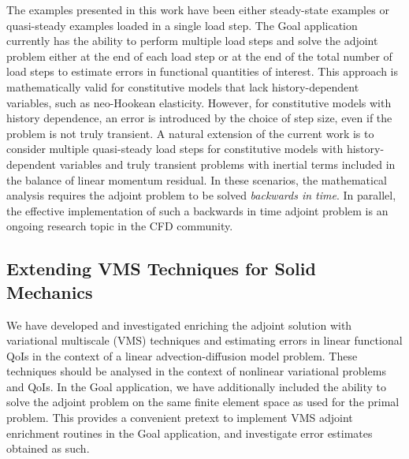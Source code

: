 The examples presented in this work have been either steady-state examples
or quasi-steady examples loaded in a single load step.
The Goal application currently has the ability to perform multiple load
steps and solve the adjoint problem either at the end of each load step
or at the end of the total number of load steps to estimate errors in functional
quantities of interest. This approach is mathematically valid for constitutive
models that lack history-dependent variables, such as neo-Hookean elasticity.
However, for constitutive models with history dependence, an error is
introduced by the choice of step size, even if the problem is not truly
transient. A natural extension of the current work is to consider multiple
quasi-steady load steps for constitutive models with history-dependent variables
and truly transient problems with inertial terms included in the balance
of linear momentum residual. In these scenarios, the mathematical analysis
requires the adjoint problem to be solved \emph{backwards in time}.
In parallel, the effective implementation of such a backwards in time adjoint
problem is an ongoing research topic in the CFD community.

\subsection{Extending VMS Techniques for Solid Mechanics}

We have developed and investigated enriching the adjoint solution with
variational multiscale (VMS) techniques and estimating errors in
linear functional QoIs in the context of a linear advection-diffusion model problem.
These techniques should be analysed in the context of nonlinear variational
problems and QoIs. In the Goal application, we have additionally included
the ability to solve the adjoint problem on the same finite element space
as used for the primal problem. This provides a convenient pretext to
implement VMS adjoint enrichment routines in the Goal application, and
investigate error estimates obtained as such.
